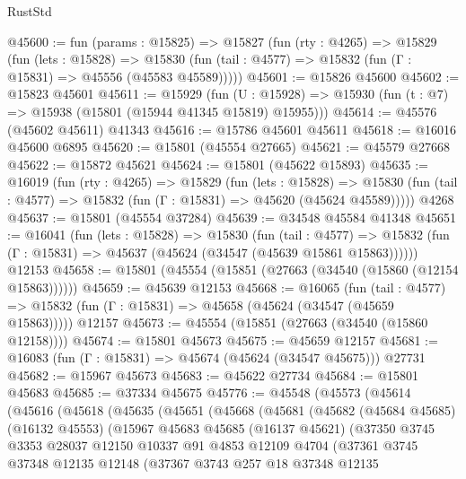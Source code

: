 \begin{lexlean}{RustStd}
\begin{coremodule}
@45600 := fun (params : @15825) =>
  @15827
    (fun (rty : @4265) =>
    @15829
      (fun (lets : @15828) =>
      @15830 (fun (tail : @4577) => @15832 (fun (Γ : @15831) => @45556 (@45583 @45589)))))
@45601 := @15826 @45600
@45602 := @15823 @45601
@45611 := @15929
    (fun (U : @15928) => @15930 (fun (t : @7) => @15938 (@15801 (@15944 @41345 @15819) @15955)))
@45614 := @45576 (@45602 @45611) @41343
@45616 := @15786 @45601 @45611
@45618 := @16016 @45600 @6895
@45620 := @15801 (@45554 @27665)
@45621 := @45579 @27668
@45622 := @15872 @45621
@45624 := @15801 (@45622 @15893)
@45635 := @16019
    (fun (rty : @4265) =>
    @15829
      (fun (lets : @15828) =>
      @15830 (fun (tail : @4577) => @15832 (fun (Γ : @15831) => @45620 (@45624 @45589)))))
    @4268
@45637 := @15801 (@45554 @37284)
@45639 := @34548 @45584 @41348
@45651 := @16041
    (fun (lets : @15828) =>
    @15830
      (fun (tail : @4577) =>
      @15832 (fun (Γ : @15831) => @45637 (@45624 (@34547 (@45639 @15861 @15863))))))
    @12153
@45658 := @15801 (@45554 (@15851 (@27663 (@34540 (@15860 (@12154 @15863))))))
@45659 := @45639 @12153
@45668 := @16065
    (fun (tail : @4577) => @15832 (fun (Γ : @15831) => @45658 (@45624 (@34547 (@45659 @15863)))))
    @12157
@45673 := @45554 (@15851 (@27663 (@34540 (@15860 @12158))))
@45674 := @15801 @45673
@45675 := @45659 @12157
@45681 := @16083 (fun (Γ : @15831) => @45674 (@45624 (@34547 @45675))) @27731
@45682 := @15967 @45673
@45683 := @45622 @27734
@45684 := @15801 @45683
@45685 := @37334 @45675
@45776 := @45548
    (@45573
      (@45614
        (@45616
          (@45618
            (@45635
              (@45651
                (@45668
                  (@45681
                    (@45682
                      (@45684 @45685)
                      (@16132 @45553)
                      (@15967
                        @45683
                        @45685
                        (@16137 @45621)
                        (@37350
                          @3745
                          @3353
                          @28037
                          @12150
                          @10337
                          @91
                          @4853
                          @12109
                          @4704
                          (@37361
                            @3745
                            @37348
                            @12135
                            @12148
                            (@37367
                              @3743
                              @257
                              @18
                              @37348
                              @12135

\end{coremodule}
\end{lexlean}
